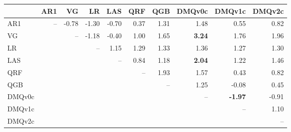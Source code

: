 \begin{tabular}{lrrrrrrrrr}
\toprule
 & AR1 & VG & LR & LAS & QRF & QGB & DMQv0c & DMQv1c & DMQv2c \\
\midrule
AR1 & -- & -0.78 & -1.30 & -0.70 & 0.37 & 1.31 & 1.48 & 0.55 & 0.82 \\
VG &  & -- & -1.18 & -0.40 & 1.00 & 1.65 & \textbf{3.24} & 1.76 & 1.96 \\
LR &  &  & -- & 1.15 & 1.29 & 1.33 & 1.36 & 1.27 & 1.30 \\
LAS &  &  &  & -- & 0.84 & 1.18 & \textbf{2.04} & 1.22 & 1.46 \\
QRF &  &  &  &  & -- & 1.93 & 1.57 & 0.43 & 0.82 \\
QGB &  &  &  &  &  & -- & 1.25 & -0.08 & 0.45 \\
DMQv0c &  &  &  &  &  &  & -- & \textbf{-1.97} & -0.91 \\
DMQv1c &  &  &  &  &  &  &  & -- & 1.10 \\
DMQv2c &  &  &  &  &  &  &  &  & -- \\
\bottomrule
\end{tabular}
